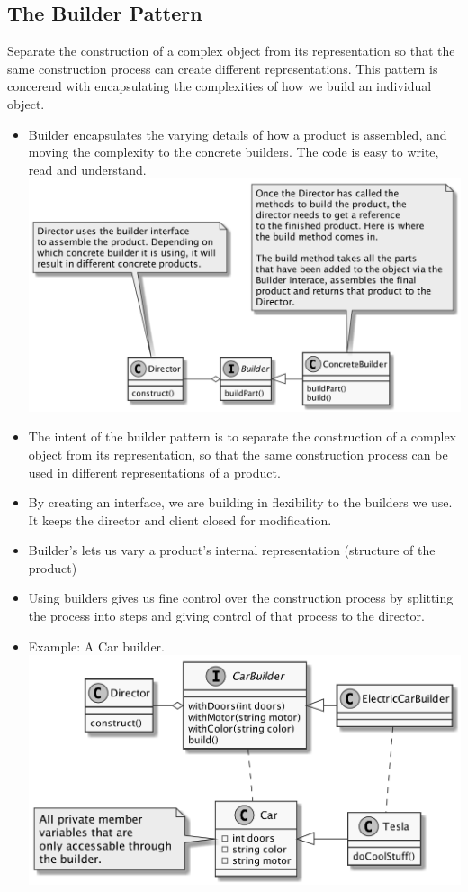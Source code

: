 \documentclass[11pt]{article}
\begin{document}
    \subsection{The Builder Pattern}
    Separate the construction of a complex object from its representation so that the same construction process can create
    different representations. This pattern is concerend with encapsulating the complexities of how we build an individual object.
    \begin{itemize}
        \item Builder encapsulates the varying details of how a product is assembled, and moving the complexity to
        the concrete builders. The code is easy to write, read and understand. \\
        \includegraphics[scale=0.2]{builder/1__builder_pattern}
        \item The intent of the builder pattern is to separate the construction of a complex object from its representation,
        so that the same construction process can be used in different representations of a product.
        \item By creating an interface, we are building in flexibility to the builders we use. It keeps the director and
        client closed for modification.
        \item Builder's lets us vary a product's internal representation (structure of the product)
        \item Using builders gives us fine control over the construction process by splitting the process into steps
        and giving control of that process to the director.
        \item Example: A Car builder.\\
        \includegraphics[scale=0.2]{builder/2__builder_pattern_car}

\end{itemize}
\end{document}
